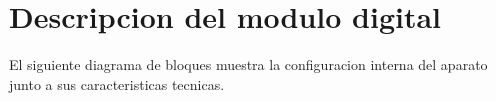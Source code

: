 \section{Descripcion del modulo digital}

El siguiente diagrama de bloques muestra la configuracion interna del aparato junto a sus caracteristicas tecnicas.

